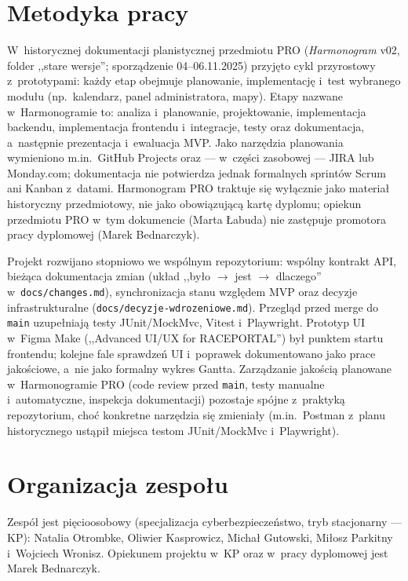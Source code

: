 \documentclass{sprz}
\begin{document}
\section{Metodyka pracy}

W~historycznej dokumentacji planistycznej przedmiotu PRO
(\emph{Harmonogram} v02, folder ,,stare wersje'';
sporządzenie 04--06.11.2025) przyjęto cykl przyrostowy
z~prototypami: każdy etap obejmuje planowanie, implementację
i~test wybranego modułu (np.\ kalendarz, panel administratora, mapy). Etapy nazwane w~Harmonogramie to: analiza i~planowanie, projektowanie, implementacja backendu, implementacja frontendu i~integracje, testy oraz dokumentacja, a~następnie prezentacja i~ewaluacja MVP. Jako narzędzia planowania wymieniono m.in.\ GitHub Projects oraz --- w~części zasobowej --- JIRA lub Monday.com; dokumentacja nie potwierdza jednak formalnych sprintów Scrum ani Kanban z~datami. Harmonogram PRO traktuje się wyłącznie jako materiał historyczny przedmiotowy, nie jako obowiązującą kartę dyplomu; opiekun przedmiotu PRO w~tym dokumencie (Marta Łabuda) nie zastępuje promotora pracy dyplomowej (Marek Bednarczyk).

Projekt rozwijano stopniowo we wspólnym repozytorium: wspólny kontrakt API, bieżąca dokumentacja zmian (układ ,,było $\rightarrow$ jest $\rightarrow$ dlaczego'' w~\texttt{docs/\allowbreak changes.md}), synchronizacja stanu względem MVP oraz decyzje infrastrukturalne (\texttt{docs/\allowbreak decyzje-\allowbreak wdro\-zeniowe.md}). Przegląd przed merge do \texttt{main} uzupełniają testy JUnit/MockMvc, Vitest i~Playwright. Prototyp UI w~Figma Make (,,Advanced UI/UX for RACEPORTAL'') był punktem startu frontendu; kolejne fale sprawdzeń UI i~poprawek dokumentowano jako prace jakościowe, a~nie jako formalny wykres Gantta. Zarządzanie jakością planowane w~Harmonogramie PRO (code review przed \texttt{main}, testy manualne i~automatyczne, inspekcja dokumentacji) pozostaje spójne z~praktyką repozytorium, choć konkretne narzędzia się zmieniały (m.in.\ Postman z~planu historycznego ustąpił miejsca testom JUnit/MockMvc i~Playwright).

\section{Organizacja zespołu}

Zespół jest pięcioosobowy (specjalizacja cyberbezpieczeństwo, tryb stacjonarny --- KP): Natalia Otrombke, Oliwier Kasprowicz, Michał Gutowski, Miłosz Parkitny i~Wojciech Wronisz. Opiekunem projektu w~KP oraz w~pracy dyplomowej jest Marek Bednarczyk.
\end{document}
